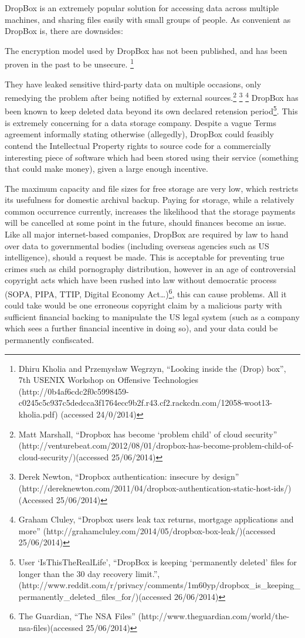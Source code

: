 \documentclass[12pt,a4paper,]{adreport}
\begin{document}
DropBox is an extremely popular solution for accessing data across
multiple machines, and sharing files easily with small groups of people.
As convenient as DropBox is, there are downsides:

The encryption model used by DropBox has not been published, and has
been proven in the past to be unsecure. \footnote{Dhiru Kholia and
  Przemysław Wegrzyn, ``Looking inside the (Drop) box'', 7th USENIX
  Workshop on Offensive Technologies
  (http://0b4af6cdc2f0c5998459-c0245c5c937c5dedcca3f1764ecc9b2f.r43.cf2.rackcdn.com/12058-woot13-kholia.pdf)
  (accessed 24/0/2014)}

They have leaked sensitive third-party data on multiple occasions, only
remedying the problem after being notified by external
sources.\footnote{Matt Marshall, ``Dropbox has become `problem child' of
  cloud security''
  (http://venturebeat.com/2012/08/01/dropbox-has-become-problem-child-of-cloud-security/)(accessed
  25/06/2014)} \footnote{Derek Newton, ``Dropbox authentication:
  insecure by design''
  (http://dereknewton.com/2011/04/dropbox-authentication-static-host-ids/)(Accessed
  25/06/2014)} \footnote{Graham Cluley, ``Dropbox users leak tax
  returns, mortgage applications and more''
  (http://grahamcluley.com/2014/05/dropbox-box-leak/)(accessed
  25/06/2014)} DropBox has been known to keep deleted data beyond its
own declared retension period\footnote{User `IsThisTheRealLife',
  ``DropBox is keeping `permanently deleted' files for longer than the
  30 day recovery limit.'',
  (http://www.reddit.com/r/privacy/comments/1m60yp/dropbox\_is\_keeping\_permanently\_deleted\_files\_for/)(accessed
  26/06/2014)}. This is extremely concerning for a data storage company.
Despite a vague Terms agreement informally stating otherwise
(allegedly), DropBox could feasibly contend the Intellectual Property
rights to source code for a commercially interesting piece of software
which had been stored using their service (something that could make
money), given a large enough incentive.

The maximum capacity and file sizes for free storage are very low, which
restricts its usefulness for domestic archival backup. Paying for
storage, while a relatively common occurrence currently, increases the
likelihood that the storage payments will be cancelled at some point in
the future, should finances become an issue. Like all major
internet-based companies, DropBox are required by law to hand over data
to governmental bodies (including overseas agencies such as US
intelligence), should a request be made. This is acceptable for
preventing true crimes such as child pornography distribution, however
in an age of controversial copyright acts which have been rushed into
law without democratic process (SOPA, PIPA, TTIP, Digital Economy
Act\ldots{})\footnote{The Guardian, ``The NSA Files''
  (http://www.theguardian.com/world/the-nsa-files)(accessed 25/06/2014)},
this can cause problems. All it could take would be one erroneous
copyright claim by a malicious party with sufficient financial backing
to manipulate the US legal system (such as a company which sees a
further financial incentive in doing so), and your data could be
permanently confiscated.
\end{document}
